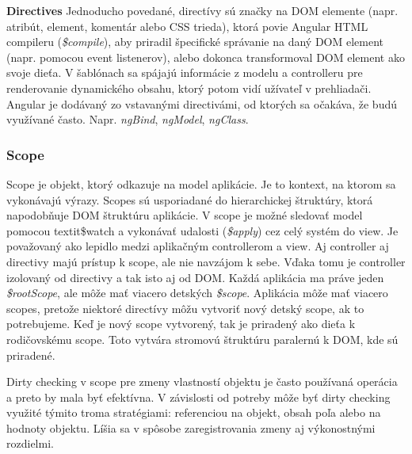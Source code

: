 \textbf{Directives}\label{angular-directives}
Jednoducho povedané, directívy sú značky na DOM elemente (napr. atribút, element, komentár alebo CSS trieda), ktorá povie Angular HTML compileru (\textit{\$compile}), aby priradil špecifické správanie na daný DOM element (napr. pomocou event listenerov), alebo dokonca transformoval DOM element ako svoje dieťa. V šablónach sa spájajú informácie z modelu a controlleru pre renderovanie dynamického obsahu, ktorý potom vidí užívateľ v prehliadači.
Angular je dodávaný zo vstavanými directivámi, od ktorých sa očakáva, že budú využívané často. Napr. \textit{ngBind}, \textit{ngModel}, \textit{ngClass}.\cite{angular-docs}

\subsubsection{Scope}
Scope je objekt, ktorý odkazuje na model aplikácie. Je to kontext, na ktorom sa vykonávajú výrazy. Scopes sú usporiadané do hierarchickej štruktúry, ktorá napodobňuje DOM štruktúru aplikácie. V scope je možné sledovať model pomocou  textit{\$watch} a vykonávať udalosti (\textit{\$apply}) cez celý systém do view. Je považovaný ako lepidlo medzi aplikačným controllerom a view. Aj controller aj directivy majú prístup k scope, ale nie navzájom k sebe. Vďaka tomu je controller izolovaný od directivy a tak isto aj od DOM. 
Každá aplikácia ma práve jeden \textit{\$rootScope}, ale môže mať viacero detských \textit{\$scope}. Aplikácia môže mať viacero scopes, pretože niektoré directívy môžu vytvoriť nový detský scope, ak to potrebujeme. Keď je nový scope vytvorený, tak je priradený ako dieťa k rodičovskému scope. Toto vytvára stromovú štruktúru paralernú k DOM, kde sú priradené.\cite{angular-docs}

Dirty checking v scope pre zmeny vlastností objektu je často používaná operácia a preto by mala byť efektívna. V závislosti od potreby môže byť dirty checking využité týmito troma stratégiami: referenciou na objekt, obsah poľa alebo na hodnoty objektu. Líšia sa v spôsobe zaregistrovania zmeny aj výkonostnými rozdielmi.

